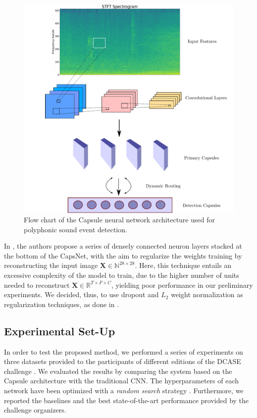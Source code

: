 \begin{figure}[htbp]
	\centering
	\includegraphics[width=\columnwidth]{img/flow_chart_2}
	\caption{Flow chart of the Capsule neural network architecture used for polyphonic sound event detection.}
	\label{fig:flowchart_capsulesed}
\end{figure}

In \cite{sabour2017dynamic}, the authors propose a series of densely connected neuron layers stacked at the bottom of the CapsNet, with the aim to regularize the weights training by reconstructing the input image $\mathbf{X} \in \mathbb{N}^{28 \times 28}$. Here, this technique entails an excessive complexity of the model to train, due to the higher number of units needed to reconstruct $\mathbf{X} \in \mathbb{R}^{T \times F \times C}$, yielding poor performance in our preliminary experiments. We decided, thus, to use dropout \cite{srivastava2014dropout} and $L_2$ weight normalization \cite{hoerl1970ridge} as regularization techniques, as done in \cite{iqbal2018capsule}.

\subsection{Experimental Set-Up}


In order to test the proposed method, we performed a series of experiments on three datasets provided to the participants of different editions of the DCASE challenge \cite{DCASE2017challenge, mesaros2016tut}. We evaluated the results by comparing the system based on the Capsule architecture with the traditional CNN. The hyperparameters of each network have been optimized with a \textit{random search} strategy \cite{bergstra2012random}. Furthermore, we reported the baselines and the best state-of-the-art performance provided by the challenge organizers.

